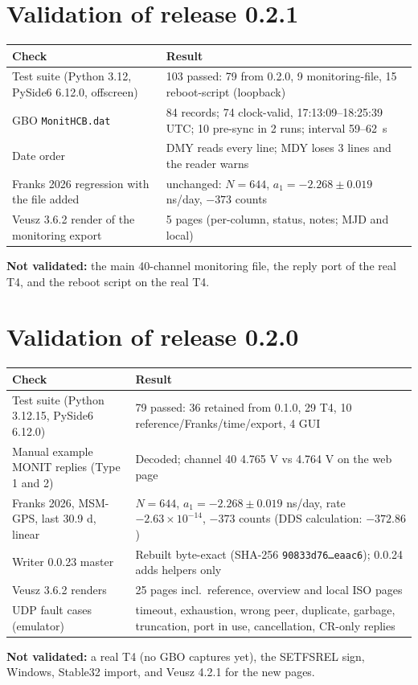 \documentclass[11pt,a4paper]{article}
\begin{document}
\section{Validation of release 0.2.1}
\begin{center}
\small
\begin{tabular}{@{}p{.42\linewidth}p{.5\linewidth}@{}}
\toprule
Check & Result\\
\midrule
Test suite (Python 3.12, PySide6 6.12.0, offscreen) & 103 passed: 79 from 0.2.0, 9 monitoring-file, 15 reboot-script (loopback)\\
GBO \texttt{MonitHCB.dat} & 84 records; 74 clock-valid, 17:13:09--18:25:39 UTC; 10 pre-sync in 2 runs; interval 59--62~s\\
Date order & DMY reads every line; MDY loses 3 lines and the reader warns\\
Franks 2026 regression with the file added & unchanged: $N=644$, $a_1=-2.268\pm0.019$ ns/day, $-373$ counts\\
Veusz 3.6.2 render of the monitoring export & 5 pages (per-column, status, notes; MJD and local)\\
\bottomrule
\end{tabular}
\end{center}
\textbf{Not validated:} the main 40-channel monitoring file, the reply port of the real T4, and the
reboot script on the real T4.

\section{Validation of release 0.2.0}
\begin{center}
\small
\begin{tabular}{@{}p{.42\linewidth}p{.5\linewidth}@{}}
\toprule
Check & Result\\
\midrule
Test suite (Python 3.12.15, PySide6 6.12.0) & 79 passed: 36 retained from 0.1.0, 29 T4, 10 reference/Franks/time/export, 4 GUI\\
Manual example MONIT replies (Type 1 and 2) & Decoded; channel 40 4.765 V vs 4.764 V on the web page\\
Franks 2026, MSM-GPS, last 30.9 d, linear & $N=644$, $a_1=-2.268\pm0.019$ ns/day, rate $-2.63\times10^{-14}$, $-373$ counts (DDS calculation: $-372.86$)\\
Writer 0.0.23 master & Rebuilt byte-exact (SHA-256 \texttt{90833d76\dots eaac6}); 0.0.24 adds helpers only\\
Veusz 3.6.2 renders & 25 pages incl.\ reference, overview and local ISO pages\\
UDP fault cases (emulator) & timeout, exhaustion, wrong peer, duplicate, garbage, truncation, port in use, cancellation, CR-only replies\\
\bottomrule
\end{tabular}
\end{center}
\textbf{Not validated:} a real T4 (no GBO captures yet), the SETFSREL sign, Windows, Stable32
import, and Veusz 4.2.1 for the new pages.
\end{document}
